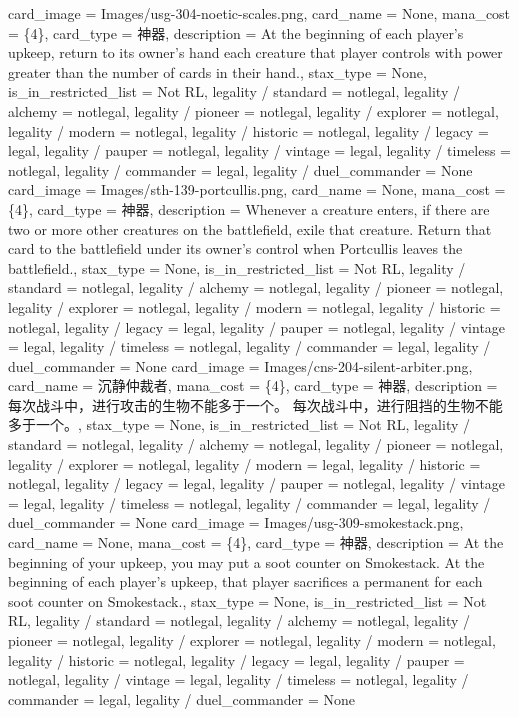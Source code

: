 \documentclass[lang = cn, color = black, 10pt]{AllThatStax}
\begin{document}
\card
{
	card_image = Images/usg-304-noetic-scales.png,
	card_name = None,
	mana_cost = \{4\},
	card_type = 神器,
	description = At the beginning of each player's upkeep, return to its owner's hand each creature that player controls with power greater than the number of cards in their hand.,
	stax_type = None,
	is_in_restricted_list = Not RL,
	legality / standard = notlegal,
	legality / alchemy = notlegal,
	legality / pioneer = notlegal,
	legality / explorer = notlegal,
	legality / modern = notlegal,
	legality / historic = notlegal,
	legality / legacy = legal,
	legality / pauper = notlegal,
	legality / vintage = legal,
	legality / timeless = notlegal,
	legality / commander = legal,
	legality / duel_commander = None
}
\card
{
	card_image = Images/sth-139-portcullis.png,
	card_name = None,
	mana_cost = \{4\},
	card_type = 神器,
	description = Whenever a creature enters, if there are two or more other creatures on the battlefield, exile that creature. Return that card to the battlefield under its owner's control when Portcullis leaves the battlefield.,
	stax_type = None,
	is_in_restricted_list = Not RL,
	legality / standard = notlegal,
	legality / alchemy = notlegal,
	legality / pioneer = notlegal,
	legality / explorer = notlegal,
	legality / modern = notlegal,
	legality / historic = notlegal,
	legality / legacy = legal,
	legality / pauper = notlegal,
	legality / vintage = legal,
	legality / timeless = notlegal,
	legality / commander = legal,
	legality / duel_commander = None
}
\card
{
	card_image = Images/cns-204-silent-arbiter.png,
	card_name = 沉静仲裁者,
	mana_cost = \{4\},
	card_type = 神器,
	description = 每次战斗中，进行攻击的生物不能多于一个。
	每次战斗中，进行阻挡的生物不能多于一个。,
	stax_type = None,
	is_in_restricted_list = Not RL,
	legality / standard = notlegal,
	legality / alchemy = notlegal,
	legality / pioneer = notlegal,
	legality / explorer = notlegal,
	legality / modern = legal,
	legality / historic = notlegal,
	legality / legacy = legal,
	legality / pauper = notlegal,
	legality / vintage = legal,
	legality / timeless = notlegal,
	legality / commander = legal,
	legality / duel_commander = None
}
\card
{
	card_image = Images/usg-309-smokestack.png,
	card_name = None,
	mana_cost = \{4\},
	card_type = 神器,
	description = At the beginning of your upkeep, you may put a soot counter on Smokestack.
	At the beginning of each player's upkeep, that player sacrifices a permanent for each soot counter on Smokestack.,
	stax_type = None,
	is_in_restricted_list = Not RL,
	legality / standard = notlegal,
	legality / alchemy = notlegal,
	legality / pioneer = notlegal,
	legality / explorer = notlegal,
	legality / modern = notlegal,
	legality / historic = notlegal,
	legality / legacy = legal,
	legality / pauper = notlegal,
	legality / vintage = legal,
	legality / timeless = notlegal,
	legality / commander = legal,
	legality / duel_commander = None
}
\end{document}
